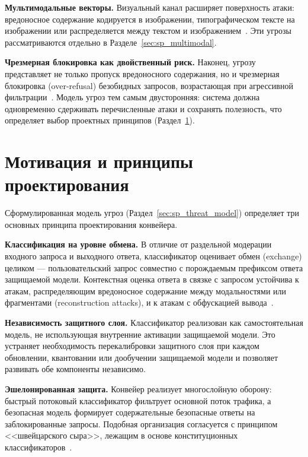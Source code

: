\textbf{Мультимодальные векторы.} Визуальный канал расширяет поверхность атаки: вредоносное содержание кодируется в изображении, типографическом тексте на изображении или распределяется между текстом и изображением~\cite{2404.05264,2402.00626}.
Эти угрозы рассматриваются отдельно в Разделе~\ref{sec:sp_multimodal}.

\textbf{Чрезмерная блокировка как двойственный риск.} Наконец, угрозу представляет не только пропуск вредоносного содержания, но и чрезмерная блокировка (over-refusal) безобидных запросов, возрастающая при агрессивной фильтрации~\cite{2406.17806}.
Модель угроз тем самым двусторонняя: система должна одновременно сдерживать перечисленные атаки и сохранять полезность, что определяет выбор проектных принципов (Раздел~\ref{sec:sp_motivation}).

\section{Мотивация и принципы проектирования}\label{sec:sp_motivation}

Сформулированная модель угроз (Раздел~\ref{sec:sp_threat_model}) определяет три основных принципа проектирования конвейера.

\textbf{Классификация на уровне обмена.} В отличие от раздельной модерации входного запроса и выходного ответа, классификатор оценивает обмен (exchange) целиком --- пользовательский запрос совместно с порождаемым префиксом ответа защищаемой модели.
Контекстная оценка ответа в связке с запросом устойчива к атакам, распределяющим вредоносное содержание между модальностями или фрагментами (reconstruction attacks), и к атакам с обфускацией вывода~\cite{cunningham2026ccpp}.

\textbf{Независимость защитного слоя.} Классификатор реализован как самостоятельная модель, не использующая внутренние активации защищаемой модели.
Это устраняет необходимость перекалибровки защитного слоя при каждом обновлении, квантовании или дообучении защищаемой модели и позволяет развивать обе компоненты независимо.

\textbf{Эшелонированная защита.} Конвейер реализует многослойную оборону: быстрый потоковый классификатор фильтрует основной поток трафика, а безопасная модель формирует содержательные безопасные ответы на заблокированные запросы.
Подобная организация согласуется с принципом <<швейцарского сыра>>, лежащим в основе конституционных классификаторов~\cite{sharma2025cc}.

